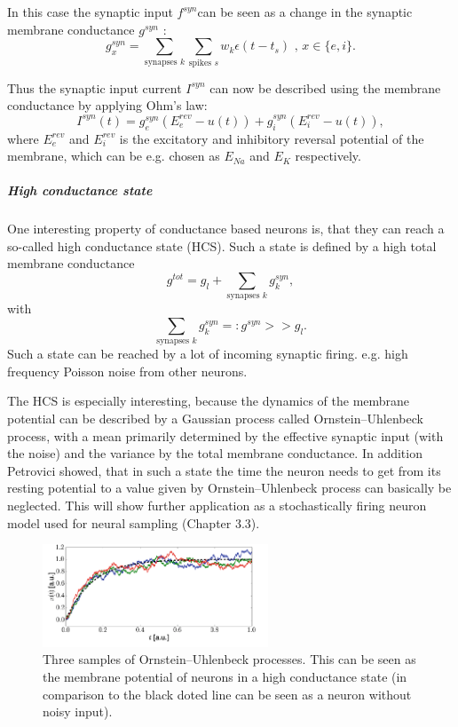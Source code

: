 In this case the synaptic input $f^{syn} $can be seen as a change in the synaptic membrane conductance $g^{syn}$ :
\[
g_x^{syn} = \sum_{\text{synapses } k } \sum_{\text{spikes } s} w_k \epsilon(t - t_s) \text{ ,      } x \in \{e, i\}.
\]

Thus the synaptic input current $I^{syn}$ can now be described using the membrane conductance by applying Ohm's law:
\[
I^{syn}(t) = g_e^{syn} (E_e^{rev} - u(t)) + g_i^{syn} (E_i^{rev} - u(t)),
\]
where $E_e^{rev}$ and $E_i^{rev}$ is the excitatory and inhibitory reversal potential of the membrane, which can be e.g. chosen as $E_{Na}$ and $E_{K}$ respectively.  

\subparagraph{High conductance state} One interesting property of conductance based neurons is, that they can reach a so-called high conductance state (HCS). Such a state is defined by a high total membrane conductance 
\[
g^{tot} = g_l + \sum_{\text{synapses } k} g_k^{syn},
\]
with 
\[
\sum_{\text{synapses } k} g_k^{syn} =: g^{syn} >> g_l .
\]
Such a state can be reached by a lot of incoming synaptic firing. e.g. high frequency Poisson noise from other neurons. 

The HCS is especially interesting, because the dynamics of the membrane potential can be described by a Gaussian process called Ornstein–Uhlenbeck process, with a mean primarily determined by the effective synaptic input (with the noise) and the variance by the total membrane conductance.
In addition Petrovici showed, that in such a state the time the neuron needs to get from its resting potential to a value given by Ornstein–Uhlenbeck process can basically be neglected.
This will show further application as a stochastically firing neuron model used for neural sampling (Chapter 3.3).

\begin{figure}
	\centering
    	\includegraphics[width=0.6\textwidth]{imgs/orn_uhl_process.png} 
    \caption{Three samples of Ornstein–Uhlenbeck processes. This can be seen as the membrane potential of neurons in a high conductance state (in comparison to the black doted line can be seen as a neuron without noisy input).}
	\label{fig:ornuhl}
\end{figure}


